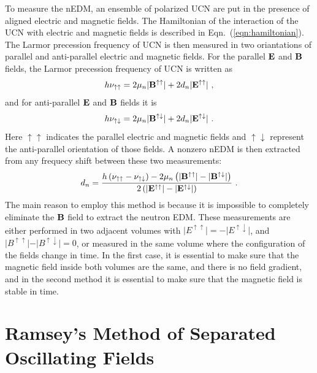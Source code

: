 To measure the nEDM, an ensemble of polarized UCN are put in the
presence of aligned electric and magnetic fields. The Hamiltonian of
the interaction of the UCN with electric and magnetic fields is
described in Eqn.~(\ref{eqn:hamiltonian}). The Larmor precession
frequency of UCN is then measured in two oriantations of parallel and
anti-parallel electric and magnetic fields. For the parallel $\bf{E}$
and $\bf{B}$ fields, the Larmor precession frequency of UCN is written
as
\begin{equation}
\label{eqn:parallelEandB}
  h \nu_{\uparrow \uparrow} = 2 \mu_n \vert {\bf{B^{\uparrow \uparrow}}} \vert+ 2 d_n\vert \bf{ E^{\uparrow \uparrow}} \vert~,
\end{equation}
and for anti-parallel  $\bf{E}$ and $\bf{B}$ fields it is
\begin{equation}
\label{eqn:antiparallelEandB}
  h \nu_{\uparrow \downarrow} = 2 \mu_n \vert {\bf{B^{\uparrow \downarrow}}} \vert+ 2 d_n\vert \bf{ E^{\uparrow \downarrow}} \vert~.
\end{equation}
Here $\uparrow \uparrow$ indicates the parallel electric and magnetic
fields and $\uparrow \downarrow$ represent the anti-parallel
orientation of those fields.  A nonzero nEDM is then extracted from
any frequecy shift between these two measurements:
\begin{equation}
  \label{eqn:dn}
  d_n = \frac{h \left( \nu_{\uparrow \uparrow} - \nu_{\uparrow \downarrow} \right) - 2 \mu_n \left( \vert {\bf{B^{\uparrow \uparrow}}} \vert -\vert {\bf{B^{\uparrow \downarrow}}} \vert \right)}{2 \left(\vert \bf{ E^{\uparrow \uparrow}} \vert - \vert \bf{ E^{\uparrow \downarrow}} \vert \right)}~.
\end{equation}
The main reason to employ this method is because it is impossible to
completely eliminate the $\bf{B}$ field to extract the neutron
EDM. These measurements are either performed in two adjacent volumes
with
$\vert E^{\uparrow \uparrow} \vert = - \vert E^{\uparrow \downarrow}
\vert$, and
$\vert B^{\uparrow \uparrow}\vert - \vert B^{\uparrow \downarrow} \vert= 0
$, or measured in the same volume where the configuration of the fields
change in time. In the first case, it is essential to make sure that
the magnetic field inside both volumes are the same, and there is no
field gradient, and in the second method it is essential to make sure
that the magnetic field is stable in time.

\section{Ramsey's Method of Separated Oscillating
  Fields\label{sec:Ramsey}}

